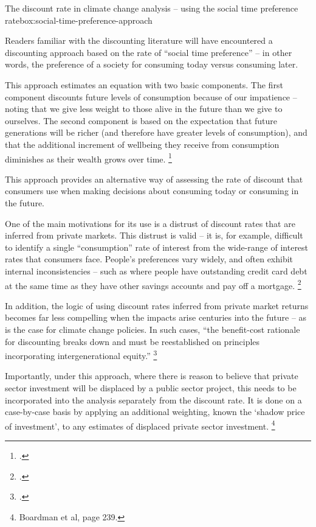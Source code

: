 \begin{bigbox}{The discount rate in climate change analysis -- using the social time preference rate}{box:social-time-preference-approach}

Readers familiar with the discounting literature will have encountered a discounting approach based on the rate of ``social time preference'' -- in other words, the preference of a society for consuming today versus consuming later. 

This approach estimates an equation with two basic components. The first component discounts future levels of consumption because of our impatience -- noting that we give less weight to those alive in the future than we give to ourselves. The second component is based on the expectation that future generations will be richer (and therefore have greater levels of consumption), and that the additional increment of wellbeing they receive from consumption diminishes as their wealth grows over time.%
    \footcite{Summers-and-Zeckhauser-Policymaking-for-posterity}

This approach provides an alternative way of assessing the rate of discount that consumers use when making decisions about consuming today or consuming in the future. 

One of the main motivations for its use is a distrust of discount rates that are inferred from private markets. This distrust is valid -- it is, for example, difficult to identify a single ``consumption'' rate of interest from the wide-range of interest rates that consumers face. People's preferences vary widely, and often exhibit internal inconsistencies -- such as where people have outstanding credit card debt at the same time as they have other savings accounts and pay off a mortgage.%
    \footcite[][29]{Harrison-Valuing-the-Future}

In addition, the logic of using discount rates inferred from private market returns becomes far less compelling when the impacts arise centuries into the future -- as is the case for climate change policies. In such cases, ``the benefit-cost rationale for discounting breaks down and must be reestablished on principles incorporating intergenerational equity.''%
    \footcite[][S-8]{Lind-1990-Reassessing-the-governments-discount-rate}

Importantly, under this approach, where there is reason to believe that private sector investment will be displaced by a public sector project, this needs to be incorporated into the analysis separately from the discount rate. It is done on a case-by-case basis by applying an additional weighting, known the `shadow price of investment', to any estimates of displaced private sector investment.%
    \footnote{Boardman et al,  page 239.}


\end{bigbox}
